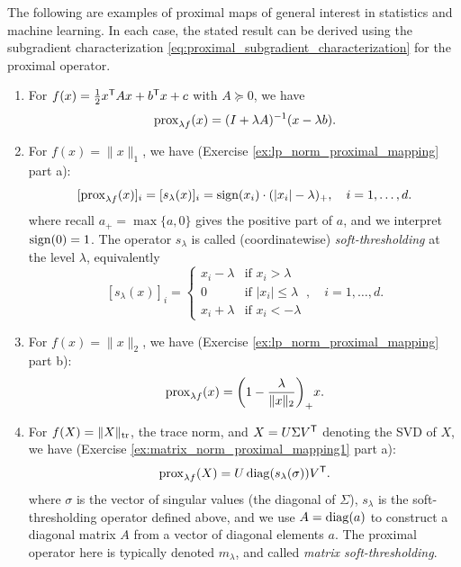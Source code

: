 \begin{Example}
\label{xa:proximal_mappings}
The following are examples of proximal maps of general interest in statistics
and machine learning. In each case, the stated result can be derived using the 
subgradient characterization \eqref{eq:proximal_subgradient_characterization} 
for the proximal operator.

\begin{enumerate}[label=\alph*., ref=\alph*]
\item For $f(x) = \frac{1}{2} x^{\mathsf{T}} A x + b^{\mathsf{T}} x + c$ with $A \succeq 0$, we have 
  \[
  \operatorname{prox}_{\lambda f}(x) = (I + \lambda A)^{-1} (x - \lambda b).
  \]

\item {} 
  For $f(x) = \|x\|_1$, we have (Exercise \ref{ex:lp_norm_proximal_mapping} part 
  a): 
  \[
  [\operatorname{prox}_{\lambda f}(x)]_i = [s_\lambda(x)]_i 
  = \operatorname{sign}(x_i) \cdot (|x_i| - \lambda)_+, \quad i = 1,\dots,d.  
  \]
  where recall $a_+ = \max\{a, 0\}$ gives the positive part of $a$, and we
  interpret $\operatorname{sign}(0) = 1$. The operator $s_\lambda$ is called (coordinatewise)
  \emph{soft-thresholding} at the level $\lambda$, equivalently   
  \begin{equation}
  \label{eq:soft_thresholding}
  [s_\lambda(x)]_i = 
  \begin{cases}
  x_i - \lambda & \text{if $x_i > \lambda$} \\
  0 & \text{if $|x_i| \leq \lambda$} \\
  x_i + \lambda & \text{if $x_i < -\lambda$}
  \end{cases},
  \quad i = 1,\dots,d.
  \end{equation}

\item {}  
  For $f(x) = \|x\|_2$, we have (Exercise \ref{ex:lp_norm_proximal_mapping} part
  b): 
  \[
  \operatorname{prox}_{\lambda f}(x) = \bigg(1 - \frac{\lambda}{\|x\|_2} \bigg)_+ x.
  \]

\item {} 
  For $f(X) = \|X\|_{\operatorname{tr}}$, the trace norm, and $X = U \Sigma V^{\mathsf{T}}$ denoting the
  SVD of $X$, we have (Exercise \ref{ex:matrix_norm_proximal_mapping1} part a):      
  \[
  \operatorname{prox}_{\lambda f}(X) = U \operatorname{diag}(s_\lambda(\sigma)) V^{\mathsf{T}}.
  \]
  where $\sigma$ is the vector of singular values (the diagonal of $\Sigma$),
  $s_\lambda$ is the soft-thresholding operator defined above, and we use $A =
  \operatorname{diag}(a)$ to construct a diagonal matrix $A$ from a vector of diagonal
  elements $a$. The proximal operator here is typically denoted $m_\lambda$, and
  called \emph{matrix soft-thresholding}.


\end{enumerate}
\end{Example}
